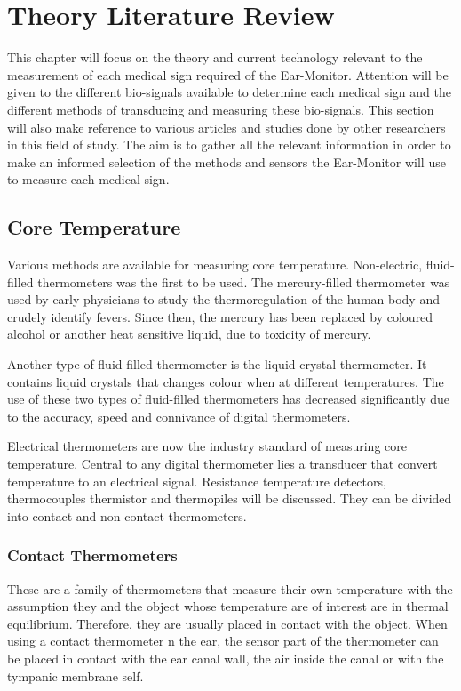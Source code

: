 \chapter{Theory Literature Review}
\label{chp:TheoryLit}
This chapter will focus on the theory and current technology relevant to the measurement of each medical sign required of the Ear-Monitor. Attention will be given to the different bio-signals available to determine each medical sign and the different methods of transducing and measuring these bio-signals. This section will also make reference to various articles and studies done by other researchers in this field of study. The aim is to gather all the relevant information in order to make an informed selection of the methods and sensors the Ear-Monitor will use to measure each medical sign.

\section{Core Temperature}
Various methods are available for measuring core temperature. Non-electric, fluid-filled thermometers was the first to be used. The mercury-filled thermometer was used by early physicians to study the thermoregulation of the human body and crudely identify fevers. Since then, the mercury has been replaced by coloured alcohol or another heat sensitive liquid, due to toxicity of mercury.

\medskip

Another type of fluid-filled thermometer is the liquid-crystal thermometer. It contains liquid crystals that changes colour when at different temperatures. The use of these two types of fluid-filled thermometers has decreased significantly due to the accuracy, speed and connivance of digital thermometers.

\medskip

Electrical thermometers are now the industry standard of measuring core temperature. Central to any digital thermometer lies a transducer that convert temperature to an electrical signal. Resistance temperature detectors, thermocouples thermistor and thermopiles will be discussed. They can be divided into contact and non-contact thermometers.

\subsection{Contact Thermometers}
These are a family of thermometers that measure their own temperature with the assumption they and the object whose temperature are of interest are in thermal equilibrium. Therefore, they are usually placed in contact with the object. When using a contact thermometer n the ear, the sensor part of the thermometer can be placed in contact with the ear canal wall, the air inside the canal or with the tympanic membrane self.

